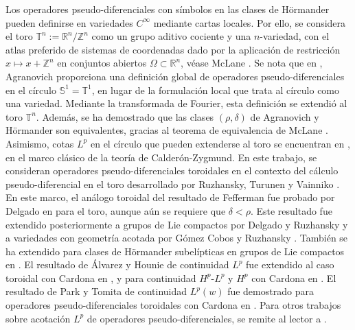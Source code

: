 Los operadores pseudo-diferenciales con símbolos en las clases de Hörmander pueden definirse en variedades $C^\infty$ mediante cartas locales. Por ello, se considera el toro $\mathbb{T}^n:=\mathbb{R}^n/\mathbb{Z}^n$ como un grupo aditivo cociente y una $n$-variedad, con el atlas preferido de sistemas de coordenadas dado por la aplicación de restricción $x\mapsto x + \mathbb{Z}^n$ en conjuntos abiertos $\Omega \subset \mathbb{R}^n$, véase McLane \cite{mclane}. Se nota que en \cite{agranovich}, Agranovich proporciona una definición global de operadores pseudo-diferenciales en el círculo $\mathbb{S}^1=\mathbb{T}^1$, en lugar de la formulación local que trata al círculo como una variedad. Mediante la transformada de Fourier, esta definición se extendió al toro $\mathbb{T}^n$. Además, se ha demostrado que las clases $(\rho,\delta)$ de Agranovich y Hörmander son equivalentes, gracias al teorema de equivalencia de McLane \cite{mclane}. Asimismo, cotas $L^p$ en el círculo que pueden extenderse al toro se encuentran en \cite{wong}, en el marco clásico de la teoría de Calderón-Zygmund. En este trabajo, se consideran operadores pseudo-diferenciales toroidales en el contexto del cálculo pseudo-diferencial en el toro desarrollado por Ruzhansky, Turunen y Vainniko \cite{ruzhansky-turunen2, ruzhansky-turunen}. En este marco, el análogo toroidal del resultado de Fefferman fue probado por Delgado en \cite{delgado} para el toro, aunque aún se requiere que $\delta<\rho$. Este resultado fue extendido posteriormente a grupos de Lie compactos por Delgado y Ruzhansky \cite{delgado-ruzhansky} y a variedades con geometría acotada por Gómez Cobos y Ruzhansky \cite{cobos-ruzhansky}. También se ha extendido para clases de Hörmander subelípticas en grupos de Lie compactos en \cite{cardona-ruzhansky-subelliptic}. El resultado  de Álvarez y Hounie de continuidad $L^p$ fue extendido al caso toroidal con Cardona en \cite{Cardona:Martinez}, y para continuidad $H^p$-$L^p$ y $H^p$ con Cardona en \cite{cardona-martinez-II}. El resultado de Park y Tomita de continuidad $L^p(w)$ fue demostrado para operadores pseudo-diferenciales toroidales con Cardona en \cite{cardona-martinez-III}. Para otros trabajos sobre acotación $L^p$ de operadores pseudo-diferenciales, se remite al lector a \cite{cardona, molahajloo-wong, ruzhansky-turunen-quant}.
